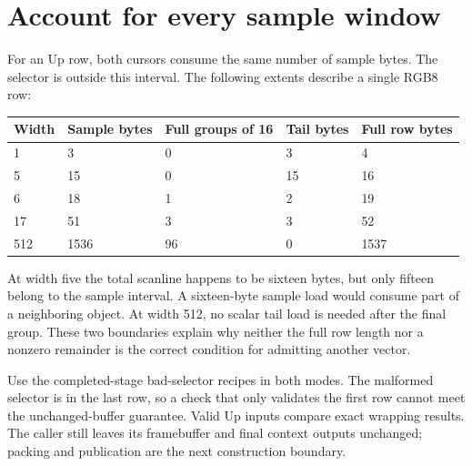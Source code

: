 \section{Account for every sample window}
For an Up row, both cursors consume the same number of sample bytes. The selector
is outside this interval. The following extents describe a single RGB8 row:
\begin{longtable}{p{20mm}p{30mm}p{30mm}p{30mm}p{30mm}}
  \toprule Width & Sample bytes & Full groups of 16 & Tail bytes & Full row bytes \\\midrule
  1              & 3            & 0                 & 3          & 4              \\
  5              & 15           & 0                 & 15         & 16             \\
  6              & 18           & 1                 & 2          & 19             \\
  17             & 51           & 3                 & 3          & 52             \\
  512            & 1536         & 96                & 0          & 1537           \\\bottomrule
\end{longtable}
At width five the total scanline happens to be sixteen bytes, but only fifteen
belong to the sample interval. A sixteen-byte sample load would consume part of a
neighboring object. At width 512, no scalar tail load is needed after the final group.
These two boundaries explain why neither the full row length nor a nonzero remainder
is the correct condition for admitting another vector.

Use the completed-stage bad-selector recipes in both modes. The malformed selector
is in the last row, so a check that only validates the first row cannot meet the
unchanged-buffer guarantee. Valid Up inputs compare exact wrapping results. The
caller still leaves its framebuffer and final context outputs unchanged; packing
and publication are the next construction boundary.
